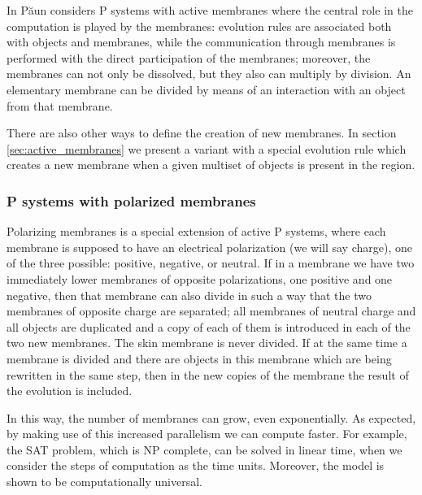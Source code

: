 In \cite{Paun99ActiveMembranes} P\u{a}un considers  P systems with active membranes where the central role in the computation is played by the membranes: evolution rules are associated both with objects and membranes, while the communication through membranes is performed with the direct participation of the membranes; moreover, the membranes can not only be dissolved, but they also can multiply by division. An elementary membrane can be divided by means of an interaction with an object from that membrane.

There are also other ways to define the creation of new membranes. In section \ref{sec:active_membranes} we present a variant with a special evolution rule which creates a new membrane when a given multiset of objects is present in the region. 


\subsubsection{P systems with polarized membranes} %
\label{ssub:p_systems_with_polarized_membranes}

 Polarizing membranes \cite{Paun99ActiveMembranes} is a special extension of active P systems, where each membrane is supposed to have an electrical polarization (we will say charge), one of the three possible: positive, negative, or neutral. If in a membrane we have two immediately lower membranes of opposite polarizations, one positive and one negative, then that membrane can also divide in such a way that the two membranes of opposite charge are separated; all membranes of neutral charge and all objects are duplicated and a copy of each of them is introduced in each of the two new membranes.
The skin membrane is never divided.
If at the same time a membrane is divided and there are objects in this membrane which are being rewritten in the same step, then in the new copies of the membrane the result of the evolution is included.

In this way, the number of membranes can grow, even exponentially. As expected, by making use of this increased parallelism we can compute faster.
For example, the SAT problem, which is NP complete, can be solved in linear time, when we consider the steps of computation as the time units.
Moreover, the model is shown to be computationally universal.



